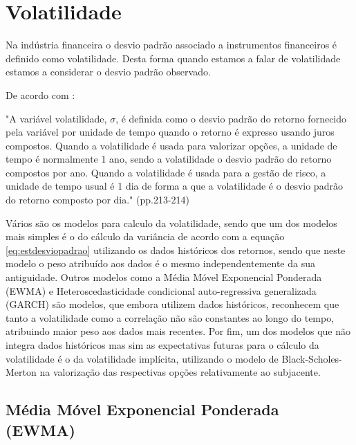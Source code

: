 \documentclass[
  12pt,
  a4paper,
  openany]{book}
\begin{document}
\hypertarget{volatilidade}{%
\section{Volatilidade}\label{volatilidade}}

Na indústria financeira o desvio padrão associado a instrumentos financeiros é definido como volatilidade. Desta forma quando estamos a falar de volatilidade estamos a considerar o desvio padrão observado.

De acordo com \citet{HullRisk2018}:

\begin{spacing}{1}
\begin{adjustwidth}{28.3464pt}{28.3464pt}\footnotesize
"A variável volatilidade, $\sigma$, é definida como o desvio padrão do retorno fornecido pela variável por unidade de tempo quando o retorno é expresso usando juros compostos. Quando a volatilidade é usada para valorizar opções, a unidade de tempo é normalmente 1 ano, sendo a volatilidade o desvio padrão do retorno compostos por ano. Quando a volatilidade é usada para a gestão de risco, a unidade de tempo usual é 1 dia de forma a que a volatilidade é o desvio padrão do retorno composto por dia." (pp.213-214)
\normalsize\end{adjustwidth}
\end{spacing}

Vários são os modelos para calculo da volatilidade, sendo que um dos modelos mais simples é o do cálculo da variância de acordo com a equação \eqref{eq:estdesviopadrao} utilizando os dados históricos dos retornos, sendo que neste modelo o peso atribuído aos dados é o mesmo independentemente da sua antiguidade. Outros modelos como a Média Móvel Exponencial Ponderada (EWMA) e Heteroscedasticidade condicional auto-regressiva generalizada (GARCH) são modelos, que embora utilizem dados históricos, reconhecem que tanto a volatilidade como a correlação não são constantes ao longo do tempo, atribuindo maior peso aos dados mais recentes. Por fim, um dos modelos que não integra dados históricos mas sim as expectativas futuras para o cálculo da volatilidade é o da volatilidade implícita, utilizando o modelo de Black-Scholes-Merton na valorização das respectivas opções relativamente ao subjacente.

\hypertarget{muxe9dia-muxf3vel-exponencial-ponderada-ewma}{%
\subsection{Média Móvel Exponencial Ponderada (EWMA)}\label{muxe9dia-muxf3vel-exponencial-ponderada-ewma}}
\end{document}

